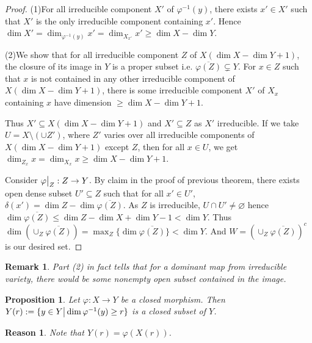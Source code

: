 \documentclass{ctexart}
\newtheorem{remark}{Remark}[section]
\newtheorem{proposition}{Proposition}[section]
\newtheorem{reason}{Reason}[section]
\begin{document}
\begin{proof}
    (1)For all irreducible component $X'$ of $\varphi^{-1}(y)$,
    there exists $x'\in X'$ such that $X'$ is the only irreducible component containing $x'$.
    Hence $\dim X' = \dim_{\varphi^{-1}(y)} x' = \dim_{X_{x'}} x' \ge \dim X - \dim Y$.
    \par
    (2)We show that for all irreducible component $Z$ of $X(\dim X - \dim Y + 1)$, 
    the closure of its image in $Y$ is a proper subset i.e. $\overline{\varphi(Z)} \subsetneq Y$.
    For $x\in Z$ such that $x$ is not contained in any other irreducible component of $X(\dim X - \dim Y + 1)$,
    there is some irreducible component $X'$ of $X_{x}$ containing $x$ have dimension $\ge \dim X - \dim Y + 1$.
    \par
    Thus $X' \subseteq X(\dim X - \dim Y + 1)$ and $X' \subseteq Z$ as $X'$ irreducible.
    If we take $U = X \setminus (\cup Z')$, where $Z'$ varies over all irreducible components of $X(\dim X - \dim Y + 1)$ except $Z$,
    then for all $x\in U$, we get $\dim_{Z_{x}} x = \dim_{X_{x}} x \ge \dim X - \dim Y + 1$.
    \par
    Consider $\varphi\big{|}_{Z}: Z \rightarrow Y$.
    By claim in the proof of previous theorem, there exists open dense subset $U' \subseteq Z$ such that for all $x'\in U'$,
    $\delta(x') = \dim Z - \dim \overline{\varphi(Z)}$.
    As $Z$ is irreducible, $U \cap U' \neq \varnothing$ hence $\dim \overline{\varphi(Z)} \le \dim Z - \dim X + \dim Y - 1 < \dim Y$.
    Thus $\dim (\cup_{Z} \overline{\varphi(Z)}) = \max_{Z} \{\dim \overline{\varphi(Z)}\} < \dim Y$.
    And $W = (\cup_{Z} \overline{\varphi(Z)})^{c}$ is our desired set.
\end{proof}
\begin{remark}
    Part (2) in fact tells that for a dominant map from irreducible variety,
    there would be some nonempty open subset contained in the image.
\end{remark}
\begin{proposition}
    Let $\varphi: X \rightarrow Y$ be a closed morphism.
    Then $Y(r) := \{y\in Y \big{|} \dim \varphi^{-1}(y) \ge r\}$ is a closed subset of $Y$.
    \label{Proposition 4.5}
\end{proposition}
\begin{reason}
    Note that $Y(r) = \varphi(X(r))$.
\end{reason}
\end{document}
